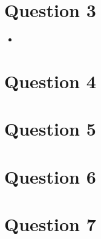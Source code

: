 \documentclass[12pt]{article}
\begin{document}
\section*{Question 3}
\begin{itemize}
    \item
\end{itemize}

\section*{Question 4}

\section*{Question 5}

\section*{Question 6}

\section*{Question 7}
\end{document}
